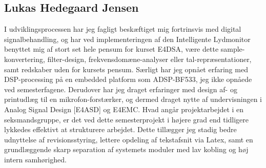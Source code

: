 \subsection*{Lukas Hedegaard Jensen}

I udviklingsprocessen har jeg fagligt beskæftiget mig fortrinsvis med digital signalbehandling, og har ved implementeringen af den Intelligente Lydmonitor benyttet mig af stort set hele pensum for kurset E4DSA, være dette sample-konvertering, filter-design, frekvensdomæne-analyser eller tal-repræsentationer, samt redskaber uden for kursets pensum. Særligt har jeg opnået erfaring med DSP-processing på en embedded platform som ADSP-BF533, jeg ikke opnåede ved semesterfagene. Derudover har jeg draget erfaringer med design af- og printudlæg til en mikrofon-forstærker, og dermed draget nytte af undervisningen i Analog Signal Design [E4ASD] og E4EMC. Hvad angår projektarbejdet i en seksmandsgruppe, er det ved dette semesterprojekt i højere grad end tidligere lykkedes effektivt at strukturere arbejdet. Dette tillægger jeg stadig bedre udnyttelse af revisionsstyring, lettere opdeling af tekstafsnit via Latex, samt en grundlæggende skarp separation af systemets moduler med lav kobling og høj intern samhørighed.